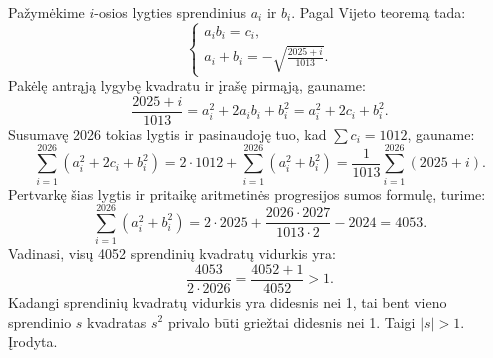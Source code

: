 \documentclass[11pt, a4paper]{scrreprt}
\begin{document}
\begin{soln}
Pažymėkime $i$-osios lygties sprendinius $a_i$ ir $b_i$. Pagal Vijeto teoremą tada:
\begin{equation*}
\begin{cases}
a_i b_i = c_i, \\
a_i + b_i = -\sqrt{\frac{2025+i}{1013}}.
\end{cases}
\end{equation*}
Pakėlę antrąją lygybę kvadratu ir įrašę pirmąją, gauname:
\begin{equation*}
\frac{2025+i}{1013} = a_i^2 + 2a_i b_i + b_i^2 = a_i^2 + 2c_i + b_i^2.
\end{equation*}
Susumavę 2026 tokias lygtis ir pasinaudoję tuo, kad $\sum c_i = 1012$, gauname:
\begin{equation*}
\sum_{i=1}^{2026} (a_i^2 + 2c_i + b_i^2) = 2 \cdot 1012 + \sum_{i=1}^{2026} (a_i^2 + b_i^2) = \frac{1}{1013} \sum_{i=1}^{2026} (2025+i).
\end{equation*}
Pertvarkę šias lygtis ir pritaikę aritmetinės progresijos sumos formulę, turime:
\begin{equation*}
\sum_{i=1}^{2026} (a_i^2 + b_i^2) = 2 \cdot 2025 + \frac{2026 \cdot 2027}{1013 \cdot 2} - 2024 = 4053.
\end{equation*}
Vadinasi, visų 4052 sprendinių kvadratų vidurkis yra:
\begin{equation*}
\frac{4053}{2 \cdot 2026} = \frac{4052+1}{4052} > 1.
\end{equation*}
Kadangi sprendinių kvadratų vidurkis yra didesnis nei 1, tai bent vieno sprendinio $s$ kvadratas $s^2$ privalo būti griežtai didesnis nei 1. Taigi $|s| > 1$. Įrodyta.
\end{soln}
\end{document}
